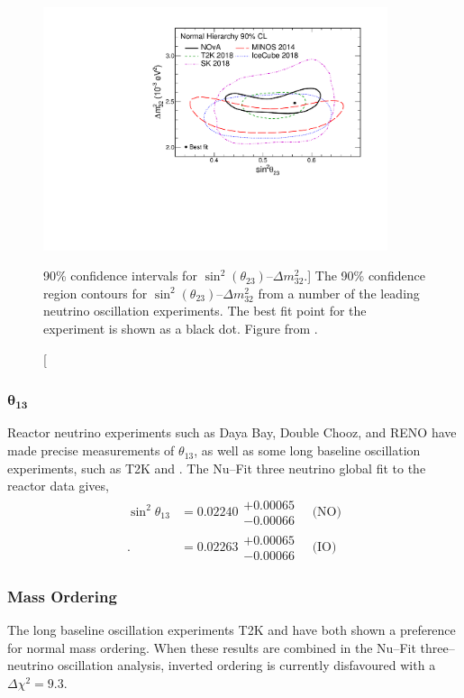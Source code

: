 \begin{figure}
	\centering
	\includegraphics[width=0.9\textwidth]{figures/theta23_msquare.pdf}
	\caption 
	[90\% confidence intervals for $\sin^2 (\theta_{23})$--$\Delta m^2_{32}$.]
	{The 90\% confidence region contours for 
	$\sin^2 (\theta_{23})$--$\Delta m^2_{32}$ from a number of the leading 
	neutrino oscillation experiments\cite{PhysRevD.96.092006, PhysRevLett.112.191801, PhysRevLett.123.151803}. 
	The best fit point for the \nova{} experiment is shown as a black dot.  
	Figure from \cite{PhysRevLett.123.151803}.}
	\label{fig:delm_sin23}
\end{figure}

\subsubsection*{$\boldsymbol{\theta_{13}}$}
Reactor neutrino experiments such as Daya Bay\cite{An:2012eh}, Double 
Chooz\cite{Abe:2013sxa}, and RENO\cite{Ahn:2012nd} have made precise
measurements of $\theta_{13}$, as well as some long baseline oscillation 
experiments, such as T2K and \nova. The Nu--Fit three neutrino global fit to 
the reactor data gives,
\begin{align*}
	\sin^2 \theta_{13} &= 0.02240 \substack{+ 0.00065 \\ - 0.00066} \quad \mbox{(NO)} \\ .
	                   &= 0.02263 \substack{+ 0.00065 \\ - 0.00066} \quad \mbox{(IO)}  
\end{align*}

\subsubsection*{Mass Ordering}
The long baseline oscillation experiments T2K and \nova have both shown a
preference for normal mass 
ordering\cite{PhysRevD.96.092006,PhysRevLett.123.151803}. When these results are
combined in the Nu--Fit three--neutrino oscillation analysis, inverted 
ordering is currently disfavoured with a $\Delta \chi^2 = 9.3$.

